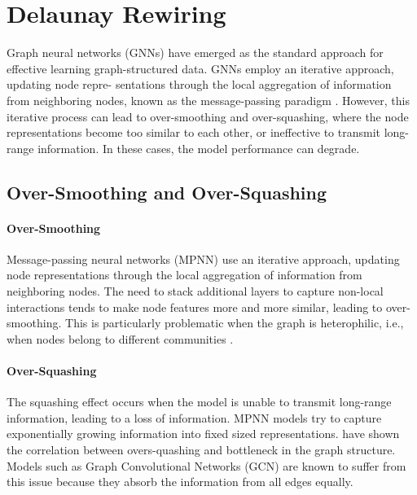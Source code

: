 \documentclass{article}
\theoremstyle{plain}
\theoremstyle{definition}
\theoremstyle{remark}
\begin{document}

\section{Delaunay Rewiring}
\label{delaunay}
Graph neural networks (GNNs) have emerged as the standard approach for effective
learning graph-structured data. GNNs employ an iterative approach, updating node repre-
sentations through the local aggregation of information from
neighboring nodes, known as the message-passing paradigm \cite{gilmer2017neural}.
However, this iterative process can lead to over-smoothing and over-squashing, where
the node representations become too similar to each other, or ineffective to 
transmit long-range information. In these cases, the model performance can degrade.

\subsection{Over-Smoothing and Over-Squashing}

\paragraph{Over-Smoothing}
Message-passing neural networks (MPNN) use an 
iterative approach, updating node representations through 
the local aggregation of information from neighboring nodes.
The need to stack additional layers to capture non-local interactions
tends to make node features more and
more similar, leading to over-smoothing. This is particularly problematic 
when the graph is heterophilic, i.e., when nodes belong to different communities 
\cite{zheng2022graph}.

\paragraph{Over-Squashing}
The squashing effect occurs when the model is unable to transmit
long-range information, leading to a loss of information. MPNN models try to 
capture exponentially growing information into fixed sized representations. 
\cite{alon2021bottleneck} have shown the correlation between overs-quashing and 
 bottleneck in the graph structure.
Models such as Graph Convolutional Networks (GCN) are known to suffer from this issue
because they absorb  the information from all edges equally.
\end{document}
